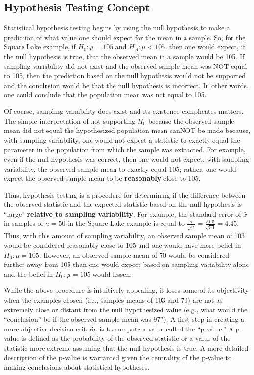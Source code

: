 \documentclass[10pt,openany]{book}\usepackage[]{graphicx}\usepackage[]{color}
\begin{document}
\subsection{Hypothesis Testing Concept}
Statistical hypothesis testing begins by using the null hypothesis to make a prediction of what value one should expect for the mean in a sample.  So, for the Square Lake example, if $H_{0}:\mu=105$ and $H_{A}:\mu<105$, then one would expect, if the null hypothesis is true, that the observed mean in a sample would be 105.  If sampling variability did not exist and the observed sample mean was NOT equal to 105, then the prediction based on the null hypothesis would not be supported and the conclusion would be that the null hypothesis is incorrect.  In other words, one could conclude that the population mean was not equal to 105.

Of course, sampling variability does exist and its existence complicates matters.  The simple interpretation of not supporting $H_{0}$ because the observed sample mean did not equal the hypothesized population mean canNOT be made because, with sampling variability, one would not expect a statistic to exactly equal the parameter in the population from which the sample was extracted.  For example, even if the null hypothesis was correct, then one would not expect, with sampling variability, the observed sample mean to exactly equal 105; rather, one would expect the observed sample mean to be \textbf{reasonably} close to 105.

Thus, hypothesis testing is a procedure for determining if the difference between the observed statistic and the expected statistic based on the null hypothesis is ``large'' \textbf{relative to sampling variability}.  For example, the standard error of $\bar{x}$ in samples of $n=50$ in the Square Lake example is equal to $\frac{\sigma}{\sqrt{n}}=$$\frac{31.5}{\sqrt{50}}$$=4.45$.  Thus, with this amount of sampling variability, an observed sample mean of 103 would be considered reasonably close to 105 and one would have more belief in $H_{0}:\mu=105$.  However, an observed sample mean of 70 would be considered further away from 105 than one would expect based on sampling variability alone and the belief in $H_{0}:\mu=105$ would lessen.

While the above procedure is intuitively appealing, it loses some of its objectivity when the examples chosen (i.e., samples means of 103 and 70) are not as extremely close or distant from the null hypothesized value (e.g., what would the ``conclusion'' be if the observed sample mean was 97?).  A first step in creating a more objective decision criteria is to compute a value called the ``p-value.''  A p-value is defined as the probability of the observed statistic or a value of the statistic more extreme assuming that the null hypothesis is true.  A more detailed description of the p-value is warranted given the centrality of the p-value to making conclusions about statistical hypotheses.
\end{document}
